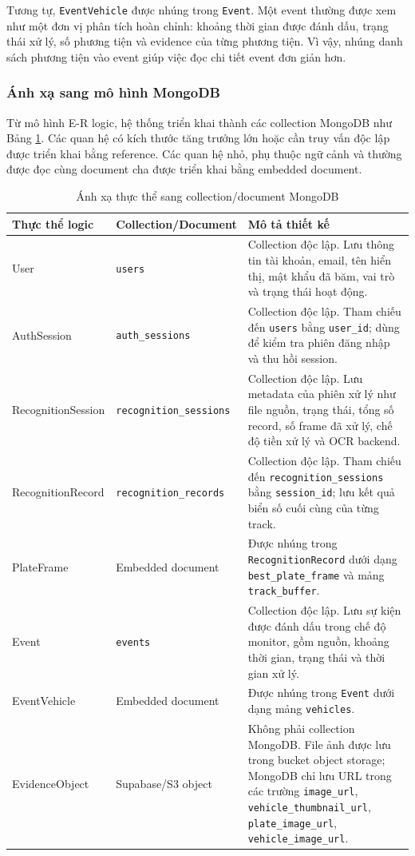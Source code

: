 Tương tự, \texttt{EventVehicle} được nhúng trong \texttt{Event}. Một event thường được xem như một đơn vị phân tích hoàn chỉnh: khoảng thời gian được đánh dấu, trạng thái xử lý, số phương tiện và evidence của từng phương tiện. Vì vậy, nhúng danh sách phương tiện vào event giúp việc đọc chi tiết event đơn giản hơn.

\subsubsection{Ánh xạ sang mô hình MongoDB}

Từ mô hình E-R logic, hệ thống triển khai thành các collection MongoDB như Bảng \ref{tab:mongodb-collections}. Các quan hệ có kích thước tăng trưởng lớn hoặc cần truy vấn độc lập được triển khai bằng reference. Các quan hệ nhỏ, phụ thuộc ngữ cảnh và thường được đọc cùng document cha được triển khai bằng embedded document.

\begin{table}[H]
\centering
\caption{Ánh xạ thực thể sang collection/document MongoDB}
\label{tab:mongodb-collections}
\begin{tabular}{|p{3.4cm}|p{3.6cm}|p{7.2cm}|}
\hline
\textbf{Thực thể logic} & \textbf{Collection/Document} & \textbf{Mô tả thiết kế} \\
\hline
User & \texttt{users} & Collection độc lập. Lưu thông tin tài khoản, email, tên hiển thị, mật khẩu đã băm, vai trò và trạng thái hoạt động. \\
\hline
AuthSession & \texttt{auth\_sessions} & Collection độc lập. Tham chiếu đến \texttt{users} bằng \texttt{user\_id}; dùng để kiểm tra phiên đăng nhập và thu hồi session. \\
\hline
RecognitionSession & \texttt{recognition\_sessions} & Collection độc lập. Lưu metadata của phiên xử lý như file nguồn, trạng thái, tổng số record, số frame đã xử lý, chế độ tiền xử lý và OCR backend. \\
\hline
RecognitionRecord & \texttt{recognition\_records} & Collection độc lập. Tham chiếu đến \texttt{recognition\_sessions} bằng \texttt{session\_id}; lưu kết quả biển số cuối cùng của từng track. \\
\hline
PlateFrame & Embedded document & Được nhúng trong \texttt{RecognitionRecord} dưới dạng \texttt{best\_plate\_frame} và mảng \texttt{track\_buffer}. \\
\hline
Event & \texttt{events} & Collection độc lập. Lưu sự kiện được đánh dấu trong chế độ monitor, gồm nguồn, khoảng thời gian, trạng thái và thời gian xử lý. \\
\hline
EventVehicle & Embedded document & Được nhúng trong \texttt{Event} dưới dạng mảng \texttt{vehicles}. \\
\hline
EvidenceObject & Supabase/S3 object & Không phải collection MongoDB. File ảnh được lưu trong bucket object storage; MongoDB chỉ lưu URL trong các trường \texttt{image\_url}, \texttt{vehicle\_thumbnail\_url}, \texttt{plate\_image\_url}, \texttt{vehicle\_image\_url}. \\
\hline
\end{tabular}
\end{table}

